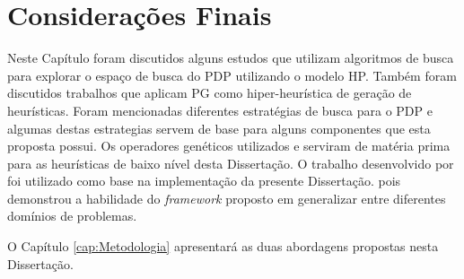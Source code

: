 \section{Considerações Finais}
\label{TrabalhosRelacionados:Conclusão}

Neste Capítulo foram discutidos alguns estudos que utilizam algoritmos de busca para explorar o espaço de busca do PDP utilizando o modelo HP. Também foram discutidos trabalhos que aplicam PG como hiper-heurística de geração de heurísticas. Foram mencionadas diferentes estratégias de busca para o PDP e algumas destas estrategias servem de base para alguns componentes que esta proposta possui. Os operadores genéticos utilizados \cite{custodio2014multiple} e \cite{lin2011protein} serviram de matéria prima para as heurísticas de baixo nível desta Dissertação. O trabalho desenvolvido por \cite{sabar2015automatic} foi utilizado como base na implementação da presente Dissertação. 
pois demonstrou a habilidade do \textit{framework} proposto em generalizar entre diferentes domínios de problemas.

O Capítulo \ref{cap:Metodologia} apresentará as duas abordagens propostas nesta Dissertação. 